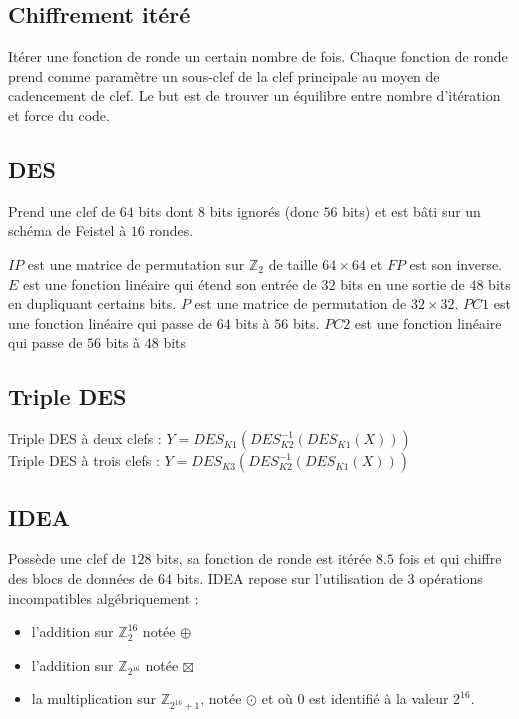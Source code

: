 \documentclass[11pt,a4paper]{report}
\begin{document}
\subsection{Chiffrement itéré}

Itérer une fonction de ronde un certain nombre de fois. Chaque fonction de ronde prend comme paramètre un sous-clef de la clef principale au moyen de cadencement de clef. Le but est de trouver un équilibre entre nombre d'itération et force du code.

\subsection{DES}

Prend une clef de $64$ bits dont $8$ bits ignorés (donc $56$ bits) et est bâti sur un schéma de Feistel à $16$ rondes.

$IP$ est une matrice de permutation sur $\mathbb{Z}_2$ de taille $64 \times 64$ et $FP$ est son inverse. $E$ est une fonction linéaire qui étend son entrée de $32$ bits en une sortie de $48$ bits en dupliquant certains bits. $P$ est une matrice de permutation de $32 \times 32$. $PC1$ est une fonction linéaire qui passe de $64$ bits à $56$ bits. $PC2$ est une fonction linéaire qui passe de $56$ bits à $48$ bits

\subsection{Triple DES}

Triple DES à deux clefs  : $Y = DES_{K1}(DES_{K2}^{-1}(DES_{K1}(X)))$ \\
Triple DES à trois clefs : $Y = DES_{K3}(DES_{K2}^{-1}(DES_{K1}(X)))$

\subsection{IDEA}

Possède une clef de $128$ bits, sa fonction de ronde est itérée $8.5$ fois et qui chiffre des blocs de données de $64$ bits. IDEA repose sur l'utilisation de 3 opérations incompatibles algébriquement :
\begin{itemize}
    \item l'addition sur $\mathbb{Z}^{16}_2$ notée $\oplus$
    \item l'addition sur $\mathbb{Z}_{2^{16}}$ notée $\boxtimes$
    \item la multiplication sur $\mathbb{Z}_{2^{16}+1}$, notée $\odot$ et où $0$ est identifié à la valeur $2^{16}$.
\end{itemize}
\end{document}
